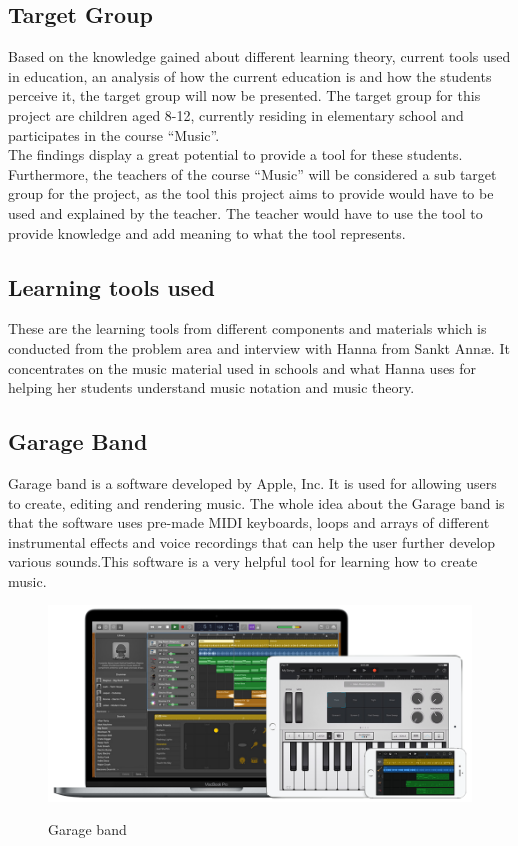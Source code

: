 \subsection{Target Group}
Based on the knowledge gained about different learning theory, current tools used in education, an analysis of how the current education is and how the students perceive it, the target group will now be presented.
The target group for this project are children aged 8-12, currently residing in elementary school and participates in the course “Music”.\\

The findings display a great potential to provide a tool for these students.
Furthermore, the teachers of the course “Music” will be considered a sub target group for the project, as the tool this project aims to provide would have to be used and explained by the teacher. The teacher would have to use the tool to provide knowledge and add meaning to what the tool represents.
 
 
\subsection{Learning tools used}%
These are the learning tools from different components and materials which is conducted from the problem area and interview with Hanna from Sankt Annæ. It concentrates on the music material used in schools and what Hanna uses for helping her students understand music notation and music theory. 

\subsection{Garage Band}
Garage band is a software developed by Apple, Inc. It is used for allowing users to create, editing and rendering music. The whole idea about the Garage band is that the software uses pre-made MIDI keyboards, loops and arrays of different instrumental effects and voice recordings that can help the user further develop various sounds.This software is a very helpful tool for learning how to create music.
\begin{figure}[H]
	\centering
	\includegraphics[width=0.7\linewidth]{figure/Analysis/garageband}
	\label{fig:garageband}
	\caption{Garage band}
	
\end{figure}

